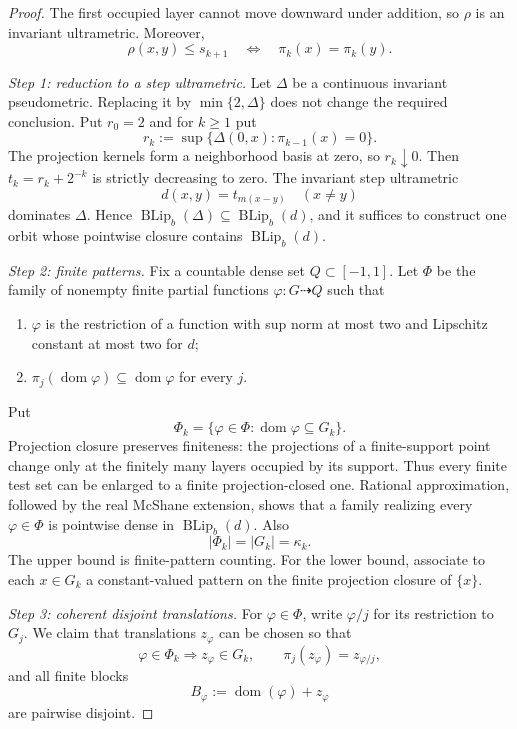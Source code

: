 \documentclass[11pt]{article}
\newcommand{\BLip}{\operatorname{BLip}_b}
\begin{document}
\begin{proof}
The first occupied layer cannot move downward under addition, so $\rho$ is an
invariant ultrametric.  Moreover,
\[
 \rho(x,y)\le s_{k+1}\quad\Longleftrightarrow\quad
 \pi_k(x)=\pi_k(y).                                  \tag{3.4}
\]

\smallskip\noindent\emph{Step 1: reduction to a step ultrametric.}
Let $\Delta$ be a continuous invariant pseudometric.  Replacing it by
$\min\{2,\Delta\}$ does not change the required conclusion.  Put $r_0=2$ and
for $k\ge1$ put
\[
 r_k:=\sup\{\Delta(0,x):\pi_{k-1}(x)=0\}.
\]
The projection kernels form a neighborhood basis at zero, so $r_k\downarrow0$.
Then $t_k=r_k+2^{-k}$ is strictly decreasing to zero.  The invariant step
ultrametric
\[
 d(x,y)=t_{m(x-y)}\quad(x\ne y)                       \tag{3.5}
\]
dominates $\Delta$.  Hence $\BLip(\Delta)\subseteq\BLip(d)$, and it suffices
to construct one orbit whose pointwise closure contains $\BLip(d)$.

\smallskip\noindent\emph{Step 2: finite patterns.}
Fix a countable dense set $Q\subset[-1,1]$.  Let $\Phi$ be the family of
nonempty finite partial functions $\varphi:G\dashrightarrow Q$ such that
\begin{enumerate}
 \item $\varphi$ is the restriction of a function with sup norm at most two
 and Lipschitz constant at most two for $d$;
 \item $\pi_j(\operatorname{dom}\varphi)\subseteq
 \operatorname{dom}\varphi$ for every $j$.
\end{enumerate}
Put
\[
 \Phi_k=\{\varphi\in\Phi:\operatorname{dom}\varphi\subseteq G_k\}.
\]
Projection closure preserves finiteness: the projections of a finite-support
point change only at the finitely many layers occupied by its support.  Thus
every finite test set can be enlarged to a finite projection-closed one.
Rational approximation, followed by the real McShane extension, shows that a
family realizing every $\varphi\in\Phi$ is pointwise dense in $\BLip(d)$.
Also
\[
 |\Phi_k|=|G_k|=\kappa_k.                              \tag{3.6}
\]
The upper bound is finite-pattern counting.  For the lower bound, associate
to each $x\in G_k$ a constant-valued pattern on the finite projection closure
of $\{x\}$.

\smallskip\noindent\emph{Step 3: coherent disjoint translations.}
For $\varphi\in\Phi$, write $\varphi/j$ for its restriction to $G_j$.
We claim that translations $z_\varphi$ can be chosen so that
\[
 \varphi\in\Phi_k\Rightarrow z_\varphi\in G_k,
 \qquad \pi_j(z_\varphi)=z_{\varphi/j},               \tag{3.7}
\]
and all finite blocks
\[
 B_\varphi:=\operatorname{dom}(\varphi)+z_\varphi     \tag{3.8}
\]
are pairwise disjoint.


\end{proof}
\end{document}
